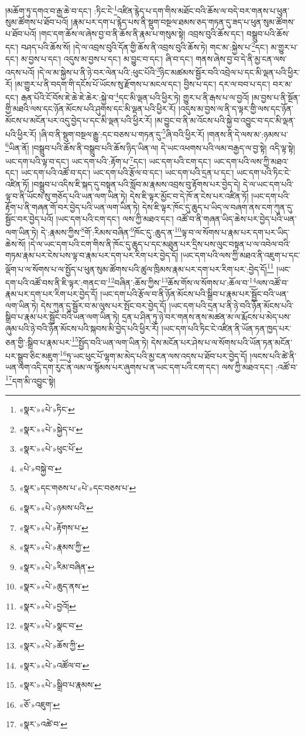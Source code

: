 །མཆོག་ཏུ་དགའ་བ་རྒྱ་ཆེ་བ་དང་། :ཏིང་ངེ་\footnote{«སྣར་»«པེ་»ཏིང་}འཛིན་རྙེད་པ་དག་གིས་མཐོང་བའི་ཆོས་ལ་བདེ་བར་གནས་པ་ཕུན་སུམ་ཚོགས་པ་ཐོབ་པའོ། །རྣམ་པར་དག་པ་རྙེད་པས་ནི་སྡུག་བསྔལ་ཐམས་ཅད་གཏན་དུ་ཟད་པ་ཕུན་སུམ་ཚོགས་པ་ཐོབ་པའོ། །གང་དག་ཆོས་ལ་ཞེས་བྱ་བ་ནི་ཆོས་ནི་རྣམ་པ་གསུམ་སྟེ། འབྲས་བུའི་ཆོས་དང་། བསྒྲུབ་པའི་ཆོས་དང་། བཤད་པའི་ཆོས་སོ། །དེ་ལ་འབྲས་བུའི་དོན་གྱི་ཆོས་ནི་འབྲས་བུའི་ཆོས་ཏེ། གང་མ་:སྐྱེས་པ་\footnote{«སྣར་»«པེ་»སྐྱེད་པ་}དང་། མ་གྱུར་པ་དང་། མ་བྱས་པ་དང་། འདུས་མ་བྱས་པ་དང་། མ་བྱུང་བ་དང་། ཞི་བ་དང་། གནས་ཞེས་བྱ་བ་དེ་ནི་མྱ་ངན་ལས་འདས་པའོ། །དེ་ལ་མ་སྐྱེས་པ་ནི་ཉེ་བར་ལེན་པའི་:ཕུང་པོའི་\footnote{«སྣར་»«པེ་»ཕུང་པོ་}ཉིང་མཚམས་སྦྱོར་བའི་འབྲེལ་པ་དང་མི་ལྡན་པའི་ཕྱིར་རོ། །མ་གྱུར་པ་ནི་བདག་གི་དངོས་པོ་ཡོངས་སུ་རྫོགས་པ་མངལ་དང་། བྱིས་པ་དང་། དར་ལ་བབ་པ་དང་། བར་མ་དང་། རྒན་པོའི་ངོ་བོས་ཇེ་ཆེ་ཇེ་ཆེར་:སྐྱེ་བ་\footnote{«པེ་»བསྐྱེ་བ་}དང་མི་ལྡན་པའི་ཕྱིར་ཏེ། གྱུར་པ་ནི་རྒས་པ་ལ་བྱའོ། །མ་བྱས་པ་ནི་སྔོན་གྱི་མཐའི་ལས་དང་ཉོན་མོངས་པའི་ཤུགས་དང་མི་ལྡན་པའི་ཕྱིར་རོ། །འདུས་མ་བྱས་ལ་ནི་ད་ལྟར་གྱི་ལས་དང་ཉོན་མོངས་པ་མངོན་པར་འདུ་བྱེད་པ་དང་མི་ལྡན་པའི་ཕྱིར་རོ། །མ་བྱུང་བ་ནི་མ་འོངས་པའི་སྐྱེ་བ་འབྱུང་བ་དང་མི་ལྡན་པའི་ཕྱིར་རོ། །ཞི་བ་ནི་སྡུག་བསྔལ་རྒྱུ་:དང་བཅས་པ་གཏན་དུ་\footnote{«སྣར་»དང་གཅས་པ་«པེ་»དང་བཅས་པ་}ཞི་བའི་ཕྱིར་རོ། །གནས་ནི་དེ་ལས་མ་:ཉམས་པ་\footnote{«སྣར་»«པེ་»ཉམས་པའི་}ཡིན་ནོ། །བསྒྲུབ་པའི་ཆོས་ནི་བསྒྲུབ་པའི་ཆོས་ཉིད་ཡིན་ལ། དེ་ཡང་འཕགས་པའི་ལམ་བརྒྱད་ལ་བྱ་སྟེ། འདི་ལྟ་སྟེ། ཡང་དག་པའི་ལྟ་བ་དང་། ཡང་དག་པའི་:རྟོག་པ་\footnote{«སྣར་»«པེ་»རྟོགས་པ་}དང་། ཡང་དག་པའི་ངག་དང་། ཡང་དག་པའི་ལས་ཀྱི་མཐའ་དང་། ཡང་དག་པའི་འཚོ་བ་དང་། ཡང་དག་པའི་རྩོལ་བ་དང་། ཡང་དག་པའི་དྲན་པ་དང་། ཡང་དག་པའི་ཏིང་ངེ་འཛིན་ཏོ། །བསྒྲུབ་པ་འདིས་ཇི་སྐད་དུ་བསྟན་པའི་སློབ་མ་རྣམས་འབྲས་བུ་རྟོགས་པར་བྱེད་དེ། དེ་ལ་ཡང་དག་པའི་ལྟ་བ་ནི་ཡོངས་སུ་གཅོད་པའི་ཡན་ལག་ཡིན་ཏེ། དེས་ཇི་ལྟར་མྱོང་བ་དེ་ཁོ་ན་ངེས་པར་འཛིན་ཏོ། །ཡང་དག་པའི་རྟོག་པ་ནི་གཞན་གོ་བར་བྱེད་པའི་ཡན་ལག་ཡིན་ཏེ། དེས་ཇི་ལྟར་ཁོང་དུ་ཆུད་པ་ཡིད་ལ་བཞག་ནས་ངག་ཀུན་དུ་སྦྱོང་བར་བྱེད་པའོ། །ཡང་དག་པའི་ངག་དང་། ལས་ཀྱི་མཐའ་དང་། འཚོ་བ་ནི་གཞན་ཡིད་ཆེས་པར་བྱེད་པའི་ཡན་ལག་ཡིན་ཏེ། དེ་:རྣམས་ཀྱིས་\footnote{«སྣར་»«པེ་»རྣམས་ཀྱི་}གོ་:རིམས་བཞིན་\footnote{«སྣར་»«པེ་»རིམ་བཞིན་}ཁོང་དུ་:ཆུད་ན་\footnote{«སྣར་»«པེ་»ཆུད་ནས་}ལྟ་བ་ལ་སོགས་པ་རྣམ་པར་དག་པར་ཡིད་ཆེས་སོ། །དེ་ལ་ཡང་དག་པའི་ངག་གིས་ནི་ཁོང་དུ་ཆུད་པ་དང་མཐུན་པར་དྲིས་པས་ལུང་བསྟན་པ་ལ་འབེལ་བའི་གཏམ་རྣམ་པར་ངེས་པས་ལྟ་བ་རྣམ་པར་དག་པར་རིག་པར་བྱེད་དོ། །ཡང་དག་པའི་ལས་ཀྱི་མཐའ་ནི་འཇུག་པ་དང་ལྡོག་པ་ལ་སོགས་པ་ལ་སྤྱོད་པ་ཕུན་སུམ་ཚོགས་པའི་ཚུལ་ཁྲིམས་རྣམ་པར་དག་པར་རིག་པར་:བྱེད་དོ།\footnote{«སྣར་»«པེ་»བྱའོ།} །ཡང་དག་པའི་འཚོ་བས་ནི་ཇི་ལྟར་:གནང་བ་\footnote{«སྣར་»«པེ་»སྣང་བ་}བཞིན་:ཆོས་ཀྱིས་\footnote{«སྣར་»«པེ་»ཆོས་ཀྱི་}ཆོས་གོས་ལ་སོགས་པ་:ཆོལ་བ་\footnote{«སྣར་»«པེ་»འཚོལ་བ་}ལས་འཚོ་བ་རྣམ་པར་དག་པར་རིག་པར་བྱེད་དོ། །ཡང་དག་པའི་རྩོལ་བ་ནི་ཉོན་མོངས་པའི་སྒྲིབ་པ་རྣམ་པར་སྦྱོང་བའི་ཡན་ལག་ཡིན་ཏེ། དེས་ཀུན་དུ་སྦྱོར་བ་མ་ལུས་པར་སྤོང་བར་བྱེད་དོ། །ཡང་དག་པའི་དྲན་པ་ནི་ཉེ་བའི་ཉོན་མོངས་པའི་སྒྲིབ་པ་རྣམ་པར་སྦྱོང་བའི་ཡན་ལག་ཡིན་ཏེ། དྲན་པ་ཤིན་ཏུ་ཉེ་བར་གནས་ནས་མཚན་མ་ལ་རྨོངས་པ་མེད་པས་ཞུམ་པའི་ཉེ་བའི་ཉོན་མོངས་པའི་སྐབས་མི་བྱེད་པའི་ཕྱིར་རོ། །ཡང་དག་པའི་ཏིང་ངེ་འཛིན་ནི་ཡོན་ཏན་ཁྱད་པར་ཅན་གྱི་:སྒྲིབ་པ་རྣམ་པར་\footnote{«སྣར་»«པེ་»སྒྲིབ་པ་རྣམས་}སྤྱོད་བའི་ཡན་ལག་ཡིན་ཏེ། དེས་མངོན་པར་ཤེས་པ་ལ་སོགས་པའི་ཡོན་ཏན་མངོན་པར་སྒྲུབ་ཅིང་མཇུག་\footnote{«ཅོ་»འཇུག་}ཏུ་ཡང་ཕུང་པོ་ལྷག་མ་མེད་པའི་མྱ་ངན་ལས་འདས་པ་ཐོབ་པར་བྱེད་དོ། །ལངས་པའི་ཚེ་ནི་ཡན་ལག་འདི་དག་རུང་ན་ལམ་ལ་སྙོམས་པར་ཞུགས་པ་ན་ཡང་དག་པའི་ངག་དང་། ལས་ཀྱི་མཐའ་དང་། :འཚོ་བ་\footnote{«སྣར་»འཚེ་བ་}དག་མི་འབྱུང་སྟེ། 